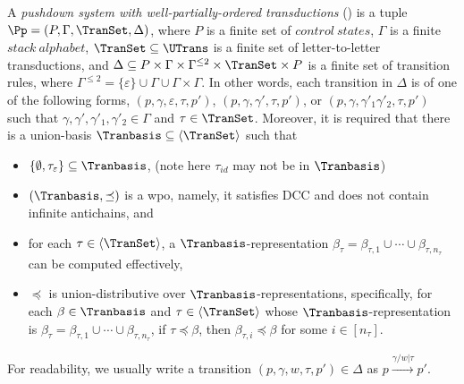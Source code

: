 \begin{definition} \label{def:defatpds}
    A \emph{pushdown system with well-partially-ordered transductions} (\WOTrPDS) is a tuple $\Pp = (P, \Gamma, \TranSet, \Delta)$, 
    where $P$ is a finite set of $control\ states$, $\Gamma$ is a finite $stack\ alphabet$, $\TranSet \subseteq \UTrans$ is a finite set of letter-to-letter transductions, and $\Delta \subseteq P \times \Gamma \times \Gamma^{\le 2} \times \TranSet \times P$ is a finite set of transition rules, where $\Gamma^{\le 2} = \{\varepsilon\} \cup \Gamma \cup \Gamma \times \Gamma$. In other words, each transition in $\Delta$ is of one of the following forms, $(p, \gamma, \varepsilon, \tau, p')$, $(p, \gamma, \gamma',\tau, p')$, or $(p, \gamma, \gamma'_1 \gamma'_2, \tau, p')$ such that $\gamma, \gamma', \gamma'_1, \gamma'_2 \in \Gamma$ and $\tau \in \TranSet$. 
   Moreover, it is required that there is a union-basis $\Tranbasis \subseteq \langle \TranSet \rangle$ such that 
   \begin{itemize}
   \item $\{\emptyset, \tau_{\varepsilon}\} \subseteq \Tranbasis$,  (note here $\tau_{id}$ may not be in $\Tranbasis$)
   \item  $(\Tranbasis, \preceq)$ is a wpo, namely, it satisfies DCC and does not contain infinite antichains, and
%
   \item for each $\tau \in \langle \TranSet \rangle$, a $\Tranbasis$-representation $\beta_\tau = \beta_{\tau, 1} \cup \cdots \cup \beta_{\tau, n_\tau}$ can be computed effectively, 
%
   \item $\preceq$ is union-distributive over $\Tranbasis$-representations, specifically, for each $\beta \in \Tranbasis$ and $\tau \in \langle \TranSet \rangle$ whose $\Tranbasis$-representation is $\beta_\tau=\beta_{\tau, 1} \cup \cdots \cup \beta_{\tau, n_\tau}$, if $\tau \preceq \beta$, then $ \beta_{\tau, i} \preceq \beta$ for some $i \in [n_\tau]$.
\end{itemize}
\end{definition}
For readability, we usually write a transition $(p, \gamma, w, \tau, p') \in \Delta$ as $p \xrightarrow{\gamma/w | \tau} p'$.

